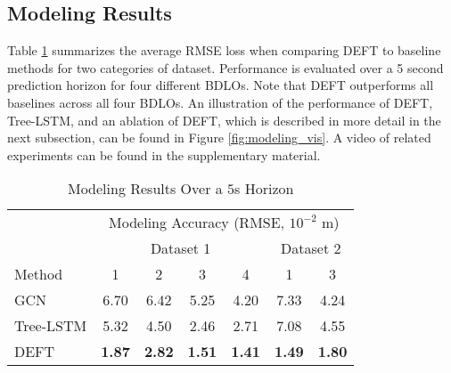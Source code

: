 \subsection{Modeling Results}
Table \ref{tab:model accuracy end points1} summarizes the average RMSE loss when comparing DEFT to baseline methods for two categories of dataset. 
Performance is evaluated over a 5 second prediction horizon for four different BDLOs. 
Note that DEFT outperforms all baselines across all four BDLOs.
An illustration of the performance of DEFT, Tree-LSTM, and an ablation of DEFT, which is described in more detail in the next subsection, can be found in Figure \ref{fig:modeling_vis}.
A video of related experiments can be found in the supplementary material.
\begin{table}[t]
\centering
\caption{Modeling Results Over a $5$s Horizon}
\begin{tabular}{l||cccc|cc}
    \toprule
    & \multicolumn{6}{c}{Modeling Accuracy (RMSE, $10^{-2}$ m)}  \\     
    & \multicolumn{4}{c|}{Dataset 1}& \multicolumn{2}{c}{Dataset 2}  \\ 
    Method & 1 & 2 & 3 & 4 & 1 & 3    \\
    \hline
    GCN \cite{GCN} & 6.70 & 6.42  & 5.25 & 4.20 & 7.33 & 4.24 \\
    Tree-LSTM \cite{treeLSTM} & 5.32 & 4.50 & 2.46 & 2.71 & 7.08 & 4.55 \\
    DEFT & \textbf{1.87} &  \textbf{2.82} &  \textbf{1.51} &  \textbf{1.41} & \textbf{1.49} &  \textbf{1.80}\\
    \bottomrule
\end{tabular}
\label{tab:model accuracy end points1}
\end{table}

